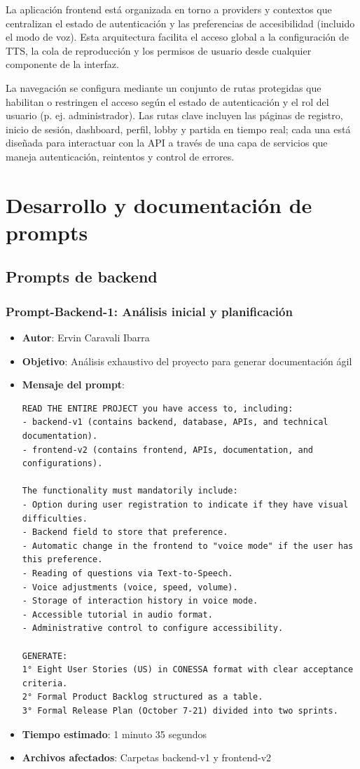 \documentclass[12pt]{article}
\begin{document}
La aplicación frontend está organizada en torno a providers y contextos que centralizan el estado de autenticación y las preferencias de accesibilidad (incluido el modo de voz). Esta arquitectura facilita el acceso global a la configuración de TTS, la cola de reproducción y los permisos de usuario desde cualquier componente de la interfaz.

La navegación se configura mediante un conjunto de rutas protegidas que habilitan o restringen el acceso según el estado de autenticación y el rol del usuario (p. ej. administrador). Las rutas clave incluyen las páginas de registro, inicio de sesión, dashboard, perfil, lobby y partida en tiempo real; cada una está diseñada para interactuar con la API a través de una capa de servicios que maneja autenticación, reintentos y control de errores.

\section{Desarrollo y documentación de prompts}

\subsection{Prompts de backend}

\subsubsection{Prompt-Backend-1: Análisis inicial y planificación}
\begin{itemize}
    \item \textbf{Autor}: Ervin Caravali Ibarra
    \item \textbf{Objetivo}: Análisis exhaustivo del proyecto para generar documentación ágil
    \item \textbf{Mensaje del prompt}:
    \begin{verbatim}
READ THE ENTIRE PROJECT you have access to, including:
- backend-v1 (contains backend, database, APIs, and technical documentation).
- frontend-v2 (contains frontend, APIs, documentation, and configurations).

The functionality must mandatorily include:
- Option during user registration to indicate if they have visual difficulties.
- Backend field to store that preference.
- Automatic change in the frontend to "voice mode" if the user has this preference.
- Reading of questions via Text-to-Speech.
- Voice adjustments (voice, speed, volume).
- Storage of interaction history in voice mode.
- Accessible tutorial in audio format.
- Administrative control to configure accessibility.

GENERATE:
1° Eight User Stories (US) in CONESSA format with clear acceptance criteria.
2° Formal Product Backlog structured as a table.
3° Formal Release Plan (October 7-21) divided into two sprints.
    \end{verbatim}
    \item \textbf{Tiempo estimado}: 1 minuto 35 segundos
    \item \textbf{Archivos afectados}: Carpetas backend-v1 y frontend-v2
\end{itemize}
\end{document}
